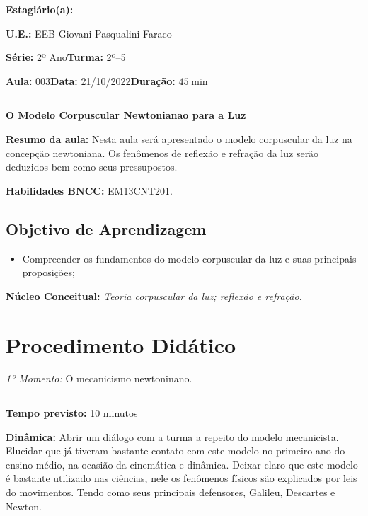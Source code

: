     \noindent \textbf{Estagiário(a): }\imprimirautor 
    
    \noindent \textbf{U.E.:} EEB Giovani Pasqualini Faraco
    
    \noindent \textbf{Série:} 2º Ano\hfill{}\textbf{Turma: }2º--5
    
    \noindent \textbf{Aula:} 003\hfill{}\textbf{Data:} 21/10/2022\hfill{}\textbf{Duração:} $45\min$
    \rule{\textwidth}{.5pt}
    \bigskip{}  
    

    \noindent
    \begin{center}
      \textbf{O Modelo Corpuscular Newtonianao para a Luz}
    \par\end{center}

    \noindent \textbf{Resumo da aula:} Nesta aula será apresentado o modelo corpuscular da luz na concepção newtoniana. Os fenômenos de reflexão e refração da luz serão deduzidos bem como seus pressupostos.

    \par\noindent \textbf{Habilidades BNCC:} EM13CNT201.
    
    \vspace*{30pt}
    \subsection*{Objetivo de Aprendizagem}
    \begin{itemize}
        \item Compreender os fundamentos do modelo corpuscular da luz e suas principais proposições;
    \end{itemize}
    \medskip{}
    \vspace*{50pt}
    
    \noindent \textbf{Núcleo Conceitual:} \emph{Teoria corpuscular da luz; reflexão e refração.}

    \newpage

    \section*{Procedimento Didático} 
    \noindent \emph{1º Momento:} O mecanicismo newtoninano. 
	\par\noindent\rule{.3\textwidth}{.5pt}  
    \par\noindent \textbf{Tempo previsto:} 10 minutos  

    \noindent \textbf{Dinâmica:} Abrir um diálogo com a turma a repeito do modelo mecanicista. Elucidar que já tiveram bastante contato com este modelo no primeiro ano do ensino médio, na ocasião da cinemática e dinâmica. Deixar claro que este modelo é bastante utilizado nas ciências, nele os fenômenos físicos são explicados por leis do movimentos. Tendo como seus principais defensores, Galileu, Descartes e Newton.

